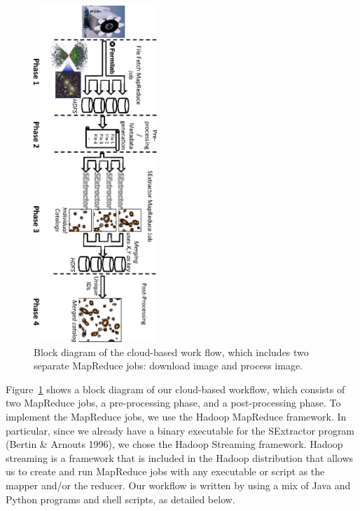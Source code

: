\begin{figure}[t!]
	\centering
	\includegraphics[height=5.0in, angle=90]{part4/Farivar_O12/Diagram.eps}
	\caption{Block diagram of the cloud-based work flow, which includes two separate MapReduce jobs: download image  and  process image.}
	\label{bdiagram}
\end{figure}


Figure~\ref{bdiagram} shows a block diagram of our cloud-based workflow, which consists of two MapReduce jobs, a pre-processing phase, and a post-processing phase. To implement the MapReduce jobs, we use the Hadoop MapReduce framework. In particular, since we already have a binary executable for the SExtractor program (Bertin \& Arnouts 1996), we chose the Hadoop Streaming framework. Hadoop streaming is a framework that is included in the Hadoop distribution that allows us to create and run MapReduce jobs with any executable or script as the mapper and/or the reducer. Our workflow is written by using a mix of Java and Python programs and shell scripts, as detailed below.


